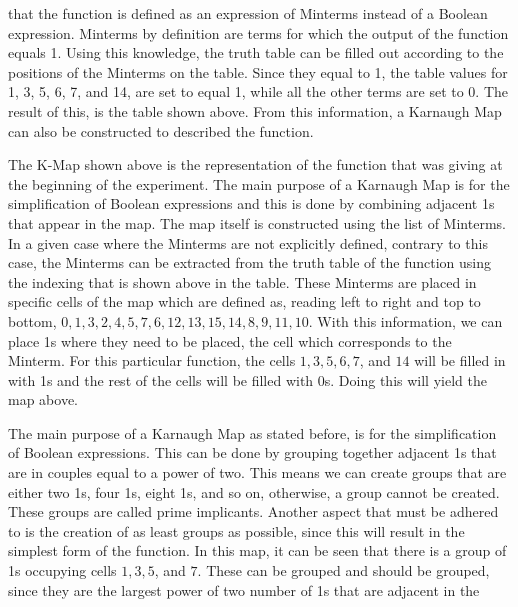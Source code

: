 \documentclass[12pt]{article}
\begin{document}
    that the function is defined as an expression of Minterms instead of a
    Boolean expression. Minterms by definition are terms for which the output of
    the function equals 1. Using this knowledge, the truth table can be filled
    out according to the positions of the Minterms on the table. Since they
    equal to 1, the table values for 1, 3, 5, 6, 7, and 14, are set to equal 1,
    while all the other terms are set to 0. The result of this, is the table
    shown above. From this information, a Karnaugh Map can also be constructed
    to described the function.
    \begin{center}
    \end{center}
    \par The K-Map shown above is the representation of the function that was
    giving at the beginning of the experiment. The main purpose of a Karnaugh
    Map is for the simplification of Boolean expressions and this is done by
    combining adjacent 1s that appear in the map. The map itself is constructed
    using the list of Minterms. In a given case where the Minterms are not
    explicitly defined, contrary to this case, the Minterms can be extracted
    from the truth table of the function using the indexing that is shown above
    in the table. These Minterms are placed in specific cells of the map which
    are defined as, reading left to right and top to bottom, $0, 1, 3, 2, 4, 5,
    7, 6, 12, 13, 15, 14, 8, 9, 11, 10$. With this information, we can place 1s
    where they need to be placed, the cell which corresponds to the Minterm. For
    this particular function, the cells $1, 3, 5, 6, 7$, and $14$ will be filled
    in with 1s and the rest of the cells will be filled with 0s. Doing this will
    yield the map above.
    \par The main purpose of a Karnaugh Map as stated before, is for the
    simplification of Boolean expressions. This can be done by grouping together
    adjacent 1s that are in couples equal to a power of two. This means we can
    create groups that are either two 1s, four 1s, eight 1s, and so on,
    otherwise, a group cannot be created. These groups are called prime
    implicants.  Another aspect that must be adhered to is the creation of as
    least groups as possible, since this will result in the simplest form of the
    function. In this map, it can be seen that there is a group of 1s occupying
    cells $1, 3, 5$, and $7$.  These can be grouped and should be grouped, since
    they are the largest power of two number of 1s that are adjacent in the
\end{document}

